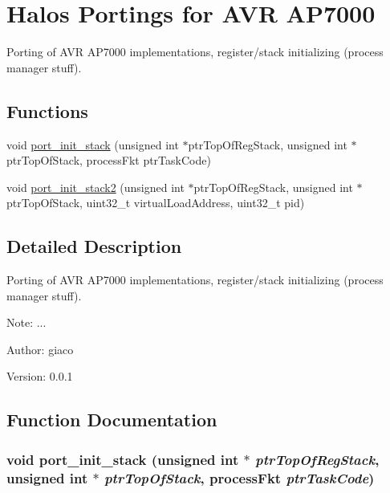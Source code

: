 \hypertarget{group___p_o_r_t_i_n_g_s_a_p7000}{
\section{Halos Portings for AVR AP7000}
\label{group___p_o_r_t_i_n_g_s_a_p7000}
}
Porting of AVR AP7000 implementations, register/stack initializing (process manager stuff).  


\subsection*{Functions}
\begin{CompactItemize}
\item 
void \hyperlink{group___p_o_r_t_i_n_g_s_a_p7000_g72a5a3ebb7b1f99dab3f781ebccfc971}{port\_\-init\_\-stack} (unsigned int $\ast$ptrTopOfRegStack, unsigned int $\ast$ptrTopOfStack, processFkt ptrTaskCode)
\item 
void \hyperlink{group___p_o_r_t_i_n_g_s_a_p7000_g0ee517fd2ee149554349f30d02f5c9b8}{port\_\-init\_\-stack2} (unsigned int $\ast$ptrTopOfRegStack, unsigned int $\ast$ptrTopOfStack, uint32\_\-t virtualLoadAddress, uint32\_\-t pid)
\end{CompactItemize}


\subsection{Detailed Description}
Porting of AVR AP7000 implementations, register/stack initializing (process manager stuff). 

\begin{Desc}
\item[Note:]... \end{Desc}
\begin{Desc}
\item[Author:]giaco \end{Desc}
\begin{Desc}
\item[Version:]0.0.1 \end{Desc}


\subsection{Function Documentation}
\hypertarget{group___p_o_r_t_i_n_g_s_a_p7000_g72a5a3ebb7b1f99dab3f781ebccfc971}{
\subsubsection[{port\_\-init\_\-stack}]{\setlength{\rightskip}{0pt plus 5cm}void port\_\-init\_\-stack (unsigned int $\ast$ {\em ptrTopOfRegStack}, \/  unsigned int $\ast$ {\em ptrTopOfStack}, \/  processFkt {\em ptrTaskCode})}}
\label{group___p_o_r_t_i_n_g_s_a_p7000_g72a5a3ebb7b1f99dab3f781ebccfc971}


